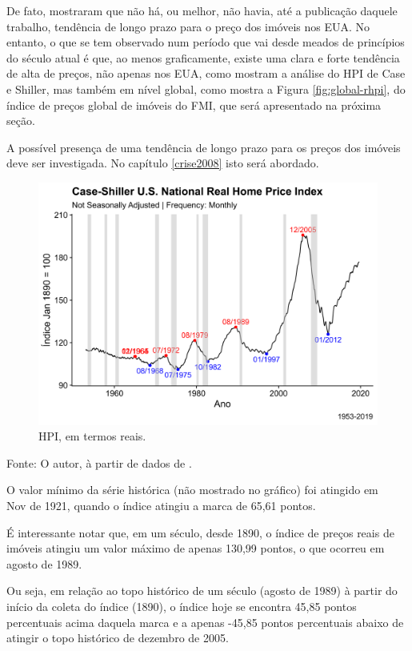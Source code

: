 \documentclass[
	12pt,				%
	oneside,			%
	a4paper,			%
	chapter=TITLE,		%
	section=TITLE,		%
	english,			%
	brazil				%
	]{abntex2}
\newcommand{\bcenter}{\begin{center}}
\newcommand{\ecenter}{\end{center}}
\begin{document}
De fato, \textcite[p.~290-291]{supplyelasticity} mostraram que não há, ou melhor, não
havia, até a publicação daquele trabalho, tendência de longo prazo para o preço
dos imóveis nos EUA. No entanto, o que se tem observado num período que vai
desde meados de princípios do século atual é que, ao menos graficamente, existe
uma clara e forte tendência de alta de preços, não apenas nos EUA, como mostram
a análise do HPI de Case e Shiller, mas também em nível global, como mostra a
Figura \ref{fig:global-rhpi}, do índice de preços global de imóveis do
\gls{FMI}, que será apresentado na próxima seção.

A possível presença de uma tendência de longo prazo para os preços dos imóveis
deve ser investigada. No capítulo \ref{crise2008} isto será abordado.
\begin{figure}[H]

{\centering \includegraphics[width=0.7\linewidth]{images/rhpi2-1} 

}

\caption{HPI, em termos reais.}\label{fig:rhpi2}
\end{figure}
\bcenter

Fonte: O autor, à partir de dados de \textcite{QuandlWIKI}.
\ecenter

O valor mínimo da série histórica (não mostrado no gráfico) foi atingido em\\
Nov de
1921, quando o índice atingiu a marca de
65,61 pontos.

É interessante notar que, em um século, desde 1890, o índice de preços reais de
imóveis atingiu um valor máximo de apenas 130,99
pontos, o que ocorreu em agosto de 1989.

Ou seja, em relação ao topo histórico de um século (agosto de 1989) à partir do
início da coleta do índice (1890), o índice hoje se encontra
45,85 pontos percentuais acima daquela
marca e a apenas -45,85 pontos
percentuais abaixo de atingir o topo histórico de dezembro de 2005.
\end{document}
